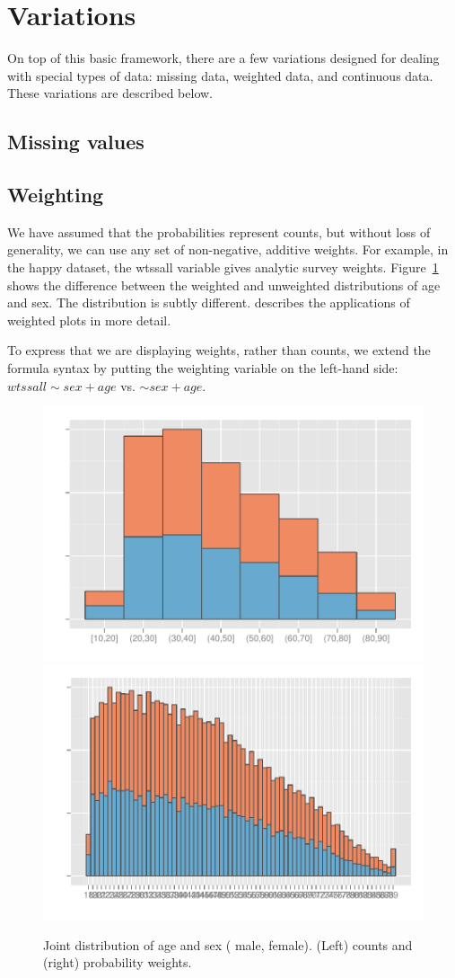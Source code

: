 \documentclass[letterpaper,oneside]{scrartcl}
\newcommand{\key}[1]
  {\protect \tikz{\fill[#1] rectangle (1ex,1ex);}}
\begin{document}
\section{Variations}
\label{sec:variations}

On top of this basic framework, there are a few variations designed for dealing with special types of data: missing data, weighted data, and continuous data.  These variations are described below.

\subsection{Missing values}
\label{sub:missing_values}



\subsection{Weighting}
\label{sub:weighting}

We have assumed that the probabilities represent counts, but without loss of generality, we can use any set of non-negative, additive weights. For example, in the happy dataset, the {\sf wtssall} variable gives analytic survey weights. Figure~\ref{fig:weighting} shows the difference between the weighted and unweighted distributions of age and sex. The distribution is subtly different. \citep{unwin:2007} describes the applications of weighted plots in more detail.

To express that we are displaying weights, rather than counts, we extend the formula syntax by putting the weighting variable on the left-hand side: $wtssall \sim sex + age$ vs. $ \sim sex + age$.

\begin{figure}[htbp]
  \centering
    \includegraphics[width=0.5\linewidth]{wt-count}%
    \includegraphics[width=0.5\linewidth]{wt-wtssall}%
  \caption{Joint distribution of age and sex (\key{male} male, \key{female} female). (Left) counts and (right) probability weights.}
  \label{fig:weighting}
\end{figure}
\end{document}
